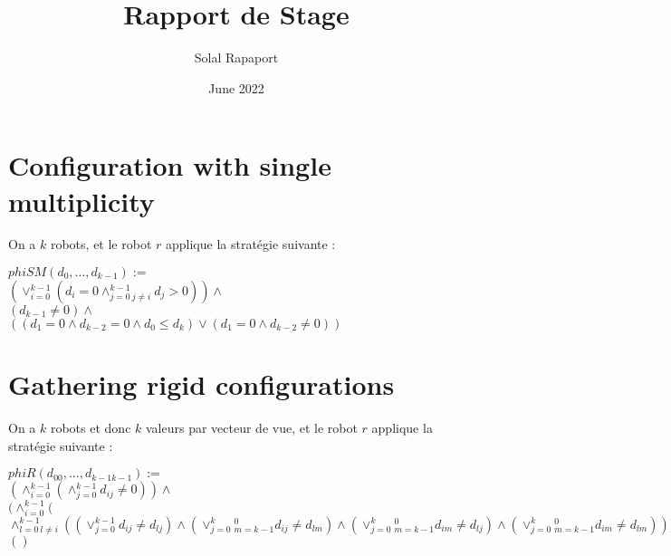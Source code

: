 \documentclass{article}
\title{Rapport de Stage}
\author{Solal Rapaport }
\date{June 2022}
\begin{document}
\maketitle

\section{Configuration with single multiplicity}

On a $k$ robots, et le robot $r$ applique la stratégie suivante :
\begin{center}
$phiSM(d_0, ..., d_{k-1}):=$\\
$(\lor_{i=0}^{k-1}(d_i = 0\land_{j=0\ j\not=i}^{k-1} d_j > 0))\land$\\
$(d_{k-1} \not= 0) \land $\\
$((d_1 = 0 \land d_{k-2} = 0 \land d_0 \leq d_k) \lor (d_1 = 0 \land d_{k-2} \not= 0))$
\end{center}

\section{Gathering rigid configurations}

On a $k$ robots et donc $k$ valeurs par vecteur de vue, et le robot $r$ applique la stratégie suivante :
\begin{center}
$phiR(d_{00}, ...,d_{k-1k-1}):=$\\
$(\land_{i=0}^{k-1}(\land_{j=0}^{k-1}d_{ij}\not=0))\land $\\
$(\land_{i=0}^{k-1}($
$\land_{l=0\ l\not=i}^{k-1}(
(\lor_{j=0}^{k-1}d_{ij} \not= d_{lj})
\land (\lor_{j=0}^{k}_{m=k-1}^{0}d_{ij} \not= d_{lm})
\land (\lor_{j=0}^{k}_{m=k-1}^{0}d_{im} \not= d_{lj})
\land (\lor_{j=0}^{k}_{m=k-1}^{0}d_{im} \not= d_{lm}) 
) ))\land$\\
$()$
\end{center}
\end{document}
